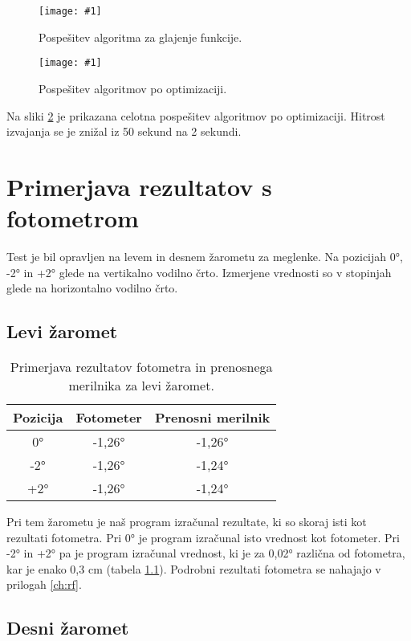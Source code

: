 \documentclass[oneside, a4paper, 12pt]{book}
\newcommand{\slika}[3]{
	\begin{figure}
	\begin{center}
	\texttt{[image: \#1]}
	\end{center}
	\vspace{-20pt}
	\caption{#2}
	\label{#3}
	\end{figure}
}
\begin{document}
\slika{slike/optimizacija_grafi/optimizacija-algoritma-za-glajenje-funkcij.jpg}{Pospešitev algoritma za glajenje funkcije.}{pic:opt-g}

\slika{slike/optimizacija_grafi/celotna-pospesitev.jpg}{Pospešitev algoritmov po optimizaciji.}{pic:opt-c}

Na sliki \ref{pic:opt-c} je prikazana celotna pospešitev algoritmov po optimizaciji. Hitrost izvajanja se je znižal iz 50 sekund na 2 sekundi.

\chapter{Primerjava rezultatov s fotometrom}
\label{ch:primerjava}
Test je bil opravljen na levem in desnem žarometu za meglenke. Na pozicijah 0°, -2° in +2° glede na vertikalno vodilno črto. Izmerjene vrednosti so v stopinjah glede na horizontalno vodilno črto.

\section{Levi žaromet}

\begin{table}
\begin{center}
\begin{tabular}{c|c|c}
\textbf{Pozicija} & \textbf{Fotometer} & \textbf{Prenosni merilnik} \\ \hline
0° & -1,26° & -1,26°  \\ \hline
-2°  & -1,26° & -1,24°   \\ \hline
+2°  & -1,26° & -1,24°   \\ 
\end{tabular}
\end{center}
\vspace{-20pt}
\caption{Primerjava rezultatov fotometra in prenosnega merilnika za levi žaromet.}

\label{tbl:primerjava-levi}
\end{table}

Pri tem žarometu je naš program izračunal rezultate, ki so skoraj isti kot rezultati fotometra. Pri 0° je program izračunal isto vrednost kot fotometer. Pri -2° in +2° pa je program izračunal vrednost, ki je za 0,02° različna od fotometra, kar je enako 0,3 cm (tabela \ref{tbl:primerjava-levi}). Podrobni rezultati fotometra se nahajajo v prilogah \ref{ch:rf}.

\section{Desni žaromet}
\end{document}

